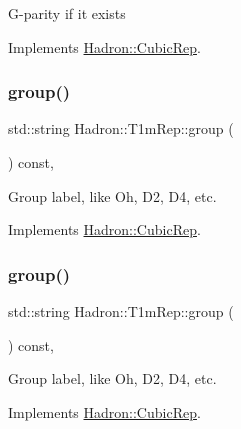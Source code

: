 G-\/parity if it exists 

Implements \mbox{\hyperlink{structHadron_1_1CubicRep_a52104e43266d1614c00bbd1c3b395458}{Hadron\+::\+Cubic\+Rep}}.

\mbox{\label{structHadron_1_1T1mRep_a2a7b361109dcc3a8e98a36eedc223470}} 
\subsubsection{\texorpdfstring{group()}{group()}\hspace{0.1cm}{\footnotesize\ttfamily [1/3]}}
{\footnotesize\ttfamily std\+::string Hadron\+::\+T1m\+Rep\+::group (\begin{DoxyParamCaption}{ }\end{DoxyParamCaption}) const\hspace{0.3cm}{\ttfamily [inline]}, {\ttfamily [virtual]}}

Group label, like Oh, D2, D4, etc. 

Implements \mbox{\hyperlink{structHadron_1_1CubicRep_a0748f11ec87f387062c8e8981339a29c}{Hadron\+::\+Cubic\+Rep}}.

\mbox{\label{structHadron_1_1T1mRep_a2a7b361109dcc3a8e98a36eedc223470}} 
\subsubsection{\texorpdfstring{group()}{group()}\hspace{0.1cm}{\footnotesize\ttfamily [2/3]}}
{\footnotesize\ttfamily std\+::string Hadron\+::\+T1m\+Rep\+::group (\begin{DoxyParamCaption}{ }\end{DoxyParamCaption}) const\hspace{0.3cm}{\ttfamily [inline]}, {\ttfamily [virtual]}}

Group label, like Oh, D2, D4, etc. 

Implements \mbox{\hyperlink{structHadron_1_1CubicRep_a0748f11ec87f387062c8e8981339a29c}{Hadron\+::\+Cubic\+Rep}}.

\mbox{\label{structHadron_1_1T1mRep_a2a7b361109dcc3a8e98a36eedc223470}} 
